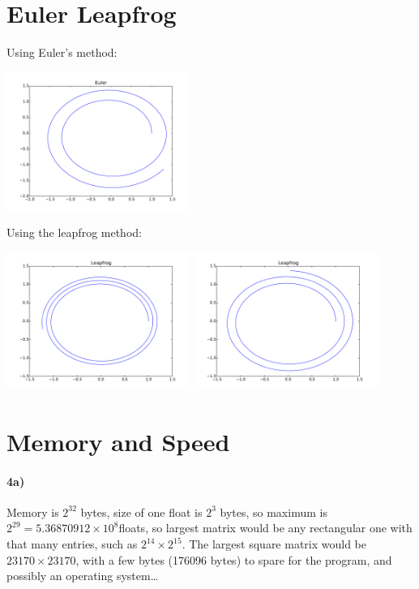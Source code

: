 \documentclass[11pt]{article}
\begin{document}
\section{Euler Leapfrog}

Using Euler's method:
\begin{center}
	\includegraphics[width=0.45\textwidth]{euler.pdf}
\end{center}
Using the leapfrog method:
\begin{center}
	\includegraphics[width=0.45\textwidth]{leapfrog.pdf}
	\includegraphics[width=0.45\textwidth]{leapfrog_bad.pdf}
\end{center}

\section{Memory and Speed}

\paragraph{4a)} Memory is $2^{32}$ bytes, size of one float is $2^3$ bytes, so
maximum is $2^{29}=5.36870912\times{}10^8$floats, so largest matrix would be
any rectangular one with that many entries, such as $2^{14}\times{}2^{15}$. The
largest square matrix would be $23170\times{}23170$, with a few bytes (176096
bytes) to spare for the program, and possibly an operating system\ldots
\end{document}
